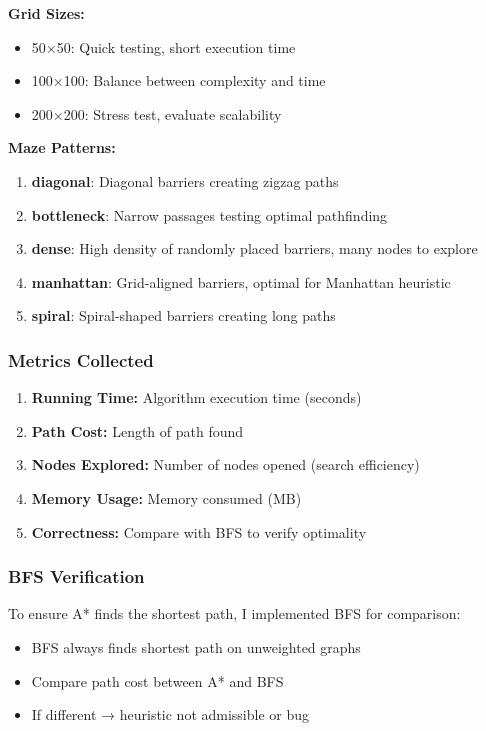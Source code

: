 \documentclass[12pt,a4paper]{article}
\begin{document}
\textbf{Grid Sizes:}
\begin{itemize}
    \item 50×50: Quick testing, short execution time
    \item 100×100: Balance between complexity and time
    \item 200×200: Stress test, evaluate scalability
\end{itemize}

\textbf{Maze Patterns:}
\begin{enumerate}
    \item \textbf{diagonal}: Diagonal barriers creating zigzag paths
    \item \textbf{bottleneck}: Narrow passages testing optimal pathfinding
    \item \textbf{dense}: High density of randomly placed barriers, many nodes to explore
    \item \textbf{manhattan}: Grid-aligned barriers, optimal for Manhattan heuristic
    \item \textbf{spiral}: Spiral-shaped barriers creating long paths
\end{enumerate}

\subsubsection{Metrics Collected}
\begin{enumerate}
    \item \textbf{Running Time:} Algorithm execution time (seconds)
    \item \textbf{Path Cost:} Length of path found
    \item \textbf{Nodes Explored:} Number of nodes opened (search efficiency)
    \item \textbf{Memory Usage:} Memory consumed (MB)
    \item \textbf{Correctness:} Compare with BFS to verify optimality
\end{enumerate}

\subsubsection{BFS Verification}
To ensure A* finds the shortest path, I implemented BFS for comparison:
\begin{itemize}
    \item BFS always finds shortest path on unweighted graphs
    \item Compare path cost between A* and BFS
    \item If different → heuristic not admissible or bug
\end{itemize}
\end{document}
